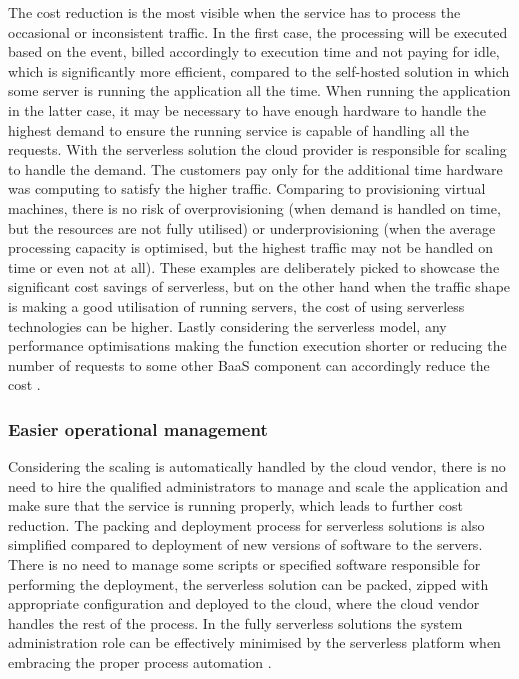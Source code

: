 The cost reduction is the most visible when the service has to process the occasional or inconsistent traffic. In the first case, the processing will be executed based on the event, billed accordingly to execution time and not paying for idle, which is significantly more efficient, compared to the self-hosted solution in which some server is running the application all the time. When running the application in the latter case, it may be necessary to have enough hardware to handle the highest demand to ensure the running service is capable of handling all the requests. With the serverless solution the cloud provider is responsible for scaling to handle the demand. The customers pay only for the additional time hardware was computing to satisfy the higher traffic. Comparing to provisioning virtual machines, there is no risk of overprovisioning (when demand is handled on time, but the resources are not fully utilised) or underprovisioning (when the average processing capacity is optimised, but the highest traffic may not be handled on time or even not at all). These examples are deliberately picked to showcase the significant cost savings of serverless, but on the other hand when the traffic shape is making a good utilisation of running servers, the cost of using serverless technologies can be higher. Lastly considering the serverless model, any performance optimisations making the function execution shorter or reducing the number of requests to some other BaaS component can accordingly reduce the cost \cite{MartinFowlerServerless}.

\subsubsection{Easier operational management} \label{chapter:serverless-easier-operational-management}

Considering the scaling is automatically handled by the cloud vendor, there is no need to hire the qualified administrators to manage and scale the application and make sure that the service is running properly, which leads to further cost reduction. The packing and deployment process for serverless solutions is also simplified compared to deployment of new versions of software to the servers. There is no need to manage some scripts or specified software responsible for performing the deployment, the serverless solution can be packed, zipped with appropriate configuration and deployed to the cloud, where the cloud vendor handles the rest of the process. In the fully serverless solutions the system administration role can be effectively minimised by the serverless platform when embracing the proper process automation \cite{MartinFowlerServerless}.

